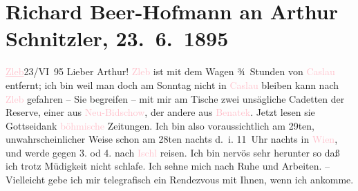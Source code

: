 

               \section[Richard Beer-Hofmann an Arthur Schnitzler, 23. 6. 1895]{ Richard Beer-Hofmann an Arthur Schnitzler, 23. 6. 1895}\nopagebreak{}\rehead{ }\normalsize\beginnumbering{} \toendnotes[C]{\smallbreak\pagebreak[2]} 
\pstart
           {\pb}\textcolor{pink}{\uline{Zleb}}{}\ledrightnote{\textcolor{pink}{Schleb}}{ }23/VI 95\pend
           \pstart
           Lieber Arthur! \textcolor{pink}{Zleb}{}\ledrightnote{\textcolor{pink}{Schleb}} ist mit
                    dem Wagen ¾ Stunden von \textcolor{pink}{Caslau}{}\ledrightnote{\textcolor{pink}{Caslau}} entfernt; ich
                    bin weil man doch am Sonntag nicht in \textcolor{pink}{Caslau}{}\ledrightnote{\textcolor{pink}{Caslau}} bleiben kann nach \textcolor{pink}{Zleb}{}\ledrightnote{\textcolor{pink}{Schleb}} gefahren – Sie begreifen – mit mir am Tische zwei
                    unsägliche Cadetten der Reserve, einer aus \textcolor{pink}{Neu-Bidschow}{}\ledrightnote{\textcolor{pink}{Nový Bydžov}}, der andere {\pb}aus \textcolor{pink}{Benatek}{}\ledrightnote{\textcolor{pink}{Benatek}}. Jetzt lesen sie Gottseidank \textcolor{pink}{böhmische}{}\ledrightnote{\textcolor{pink}{Böhmen}} Zeitungen.\pend
           \pstart
           Ich bin also voraussichtlich am 29ten, unwahrscheinlicher Weise
                    schon am 28ten{ }nachts d. i. 11 Uhr nachts in \textcolor{pink}{Wien}{}\ledrightnote{\textcolor{pink}{Wien}}, und werde gegen 3. od 4. nach
                        \textcolor{pink}{Ischl}{}\ledrightnote{\textcolor{pink}{Bad Ischl}} reisen. Ich bin nervös sehr
                    herunter {\pb}so daß ich trotz
                    Müdigkeit nicht schlafe. Ich sehne mich nach Ruhe und Arbeiten. –\pend
           \pstart
           Vielleicht gebe ich mir telegrafisch ein Rendezvous mit Ihnen, wenn ich ankomme.

